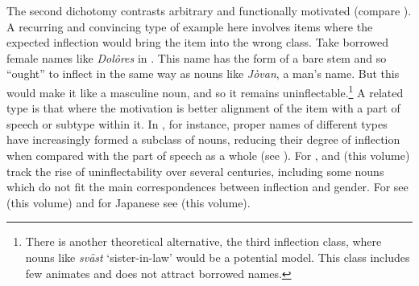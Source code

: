 \documentclass[output=paper,colorlinks,citecolor=brown]{langscibook}
\begin{document}
The second dichotomy contrasts arbitrary and functionally motivated (compare \citealt[147]{spencer2020}). A recurring and convincing type of example here involves items where the expected inflection would bring the item into the wrong class. Take borrowed female names like \textit{Dolôres} in  \citep[378]{browne1993-serbocroat}. This name has the form of a bare stem and so ``ought'' to inflect in the same way as nouns like \textit{Jòvan}, a man's name. But this would make it like a masculine noun, and so it remains uninflectable.\footnote{There is another theoretical alternative, the third inflection class, where nouns like \textit{svȃst} `sister-in-law' would be a potential model. This class includes few animates and does not attract borrowed names.} A related type is that where the motivation is better alignment of the item with a part of speech or subtype within it. In , for instance, proper names of different types have increasingly formed a subclass of nouns, reducing their degree of inflection when compared with the part of speech as a whole (see \citealt[344--349]{nubling2017}). For , \citet{dachillethornton2003} and \citeauthor{thorntondachille2025} (this volume) track the rise of uninflectability over several centuries, including some nouns which do not fit the main correspondences between inflection and gender. For  see \citeauthor{gaszewski2025} (this volume) and for Japanese see \citeauthor{kohlich2025} (this volume).
\end{document}

